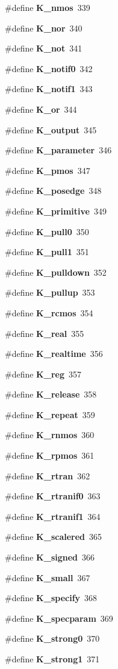 \begin{CompactItemize}
\#define {\bf K\_\-nmos}\ 339
\item 
\#define {\bf K\_\-nor}\ 340
\item 
\#define {\bf K\_\-not}\ 341
\item 
\#define {\bf K\_\-notif0}\ 342
\item 
\#define {\bf K\_\-notif1}\ 343
\item 
\#define {\bf K\_\-or}\ 344
\item 
\#define {\bf K\_\-output}\ 345
\item 
\#define {\bf K\_\-parameter}\ 346
\item 
\#define {\bf K\_\-pmos}\ 347
\item 
\#define {\bf K\_\-posedge}\ 348
\item 
\#define {\bf K\_\-primitive}\ 349
\item 
\#define {\bf K\_\-pull0}\ 350
\item 
\#define {\bf K\_\-pull1}\ 351
\item 
\#define {\bf K\_\-pulldown}\ 352
\item 
\#define {\bf K\_\-pullup}\ 353
\item 
\#define {\bf K\_\-rcmos}\ 354
\item 
\#define {\bf K\_\-real}\ 355
\item 
\#define {\bf K\_\-realtime}\ 356
\item 
\#define {\bf K\_\-reg}\ 357
\item 
\#define {\bf K\_\-release}\ 358
\item 
\#define {\bf K\_\-repeat}\ 359
\item 
\#define {\bf K\_\-rnmos}\ 360
\item 
\#define {\bf K\_\-rpmos}\ 361
\item 
\#define {\bf K\_\-rtran}\ 362
\item 
\#define {\bf K\_\-rtranif0}\ 363
\item 
\#define {\bf K\_\-rtranif1}\ 364
\item 
\#define {\bf K\_\-scalered}\ 365
\item 
\#define {\bf K\_\-signed}\ 366
\item 
\#define {\bf K\_\-small}\ 367
\item 
\#define {\bf K\_\-specify}\ 368
\item 
\#define {\bf K\_\-specparam}\ 369
\item 
\#define {\bf K\_\-strong0}\ 370
\item 
\#define {\bf K\_\-strong1}\ 371
\item 

\end{CompactItemize}
